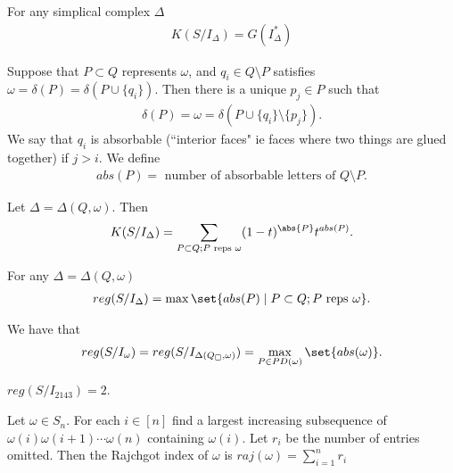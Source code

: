 \begin{theorem}
    For any simplical complex $\Delta$
    \begin{align*}
        K( S/ I_\Delta) = G(I_\Delta^*)
    \end{align*}
\end{theorem}

\begin{definition}
    Suppose that $P \subset Q$ represents $\omega$, and $q_i \in Q \setminus P$ satisfies $\omega = \delta (P) = \delta (P \cup \{ q_i \} )$. Then there is a unique $p_j \in P$ such that
    \begin{align*}
        \delta (P) = \omega = \delta ( P \cup \{ q_i \} \setminus \{ p_j \} ).
    \end{align*}
    We say that $q_i$ is absorbable (``interior faces" ie faces where two things are glued together) if $j > i$. We define
    \begin{align*}
        abs(P) = \text{ number of absorbable letters of $Q \setminus P$}.
    \end{align*}
\end{definition}

\begin{theorem}
    Let $\Delta = \Delta ( Q, \omega)$. Then
    \begin{align*}
        K( S/I_\Delta ) = \sum_{P \subset Q; P \text{ reps } \omega} (1-t)^{\abs{P}} t^{abs(P)}.
    \end{align*}
\end{theorem}

\begin{corollary}
    For any $\Delta = \Delta ( Q , \omega)$
    \begin{align*}
        reg(S/ I_\Delta) = \max \set{ abs(P) \mid P \subset Q;  P \text{ reps } \omega}.
    \end{align*}
\end{corollary}

\begin{corollary}
    We have that
    \begin{align*}
        reg(S / I_\omega) = reg(S/ I_{\Delta (Q_\square , \omega) }) = \max_{P \in PD(\omega) } \set{abs(\omega) }.
    \end{align*}
\end{corollary}

\begin{example}
    $reg(S / I_{2143}) = 2$.
\end{example}

\begin{definition}
    Let $\omega \in S_n$. For each $i \in [n]$ find a largest increasing subsequence of $\omega ( i ) \omega( i + 1) \cdots \omega (n)$ containing $\omega (i)$. Let $r_i$ be the number of entries omitted. Then the Rajchgot index of $\omega$ is $raj(\omega ) = \sum_{i=1}^n r_i$
\end{definition}

